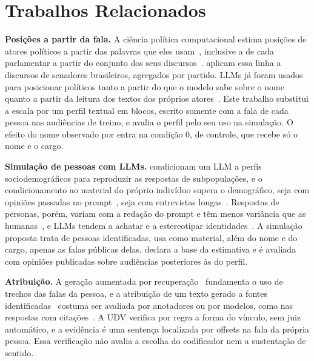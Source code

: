 \section{Trabalhos Relacionados}
\label{sec:relacionados}

\textbf{Posições a partir da fala.} A ciência política computacional estima posições de atores
políticos a partir das palavras que eles usam~\citep{laver2003extracting}, inclusive a de cada
parlamentar a partir do conjunto dos seus discursos~\citep{lauderdale2016measuring}.
\citet{izumi2021government} aplicam essa linha a discursos de senadores brasileiros, agregados por
partido. LLMs já foram usados para posicionar políticos tanto a partir do que o modelo sabe sobre o
nome~\citep{wu2023large} quanto a partir da leitura dos textos dos próprios
atores~\citep{lemens2025positioning}. Este trabalho substitui a escala por um perfil textual em
blocos, escrito somente com a fala de cada pessoa nas audiências de treino, e avalia o perfil pelo seu
uso na simulação. O efeito do nome observado por \citet{wu2023large} entra na condição 0, de
controle, que recebe só o nome e o cargo.

\textbf{Simulação de pessoas com LLMs.} \citet{argyle2023outofone} condicionam um LLM a perfis
sociodemográficos para reproduzir as respostas de subpopulações, e o condicionamento ao material do
próprio indivíduo supera o demográfico, seja com opiniões passadas no
prompt~\citep{hwang2023aligning}, seja com entrevistas longas~\citep{park2026llm}. Respostas de
personas, porém, variam com a redação do prompt e têm menos variância que as
humanas~\citep{bisbee2024synthetic}, e LLMs tendem a achatar e a estereotipar
identidades~\citep{wang2025large}. A simulação proposta trata de pessoas identificadas, usa como
material, além do nome e do cargo, apenas as falas públicas delas, declara a base da estimativa e é avaliada com opiniões publicadas sobre
audiências posteriores às do perfil.

\textbf{Atribuição.} A geração aumentada por recuperação~\citep{lewis2020rag} fundamenta o uso de
trechos das falas da pessoa, e a atribuição de um texto gerado a fontes
identificadas~\citep{rashkin2023measuring} costuma ser avaliada por anotadores ou por modelos, como
nas respostas com citações~\citep{gao2023enabling}. A UDV verifica por regra a forma do vínculo, sem
juiz automático, e a evidência é uma sentença localizada por offsets na fala da própria pessoa. Essa
verificação não avalia a escolha do codificador nem a sustentação de sentido.
